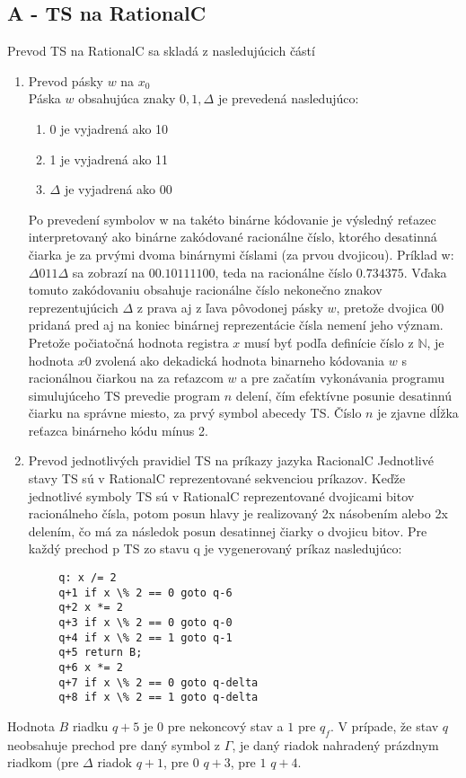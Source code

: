 \documentclass[10pt]{article}
\begin{document}
\subsection*{A - TS na RationalC}
Prevod TS na RationalC sa skladá z nasledujúcich částí
\begin{enumerate}
    \item Prevod pásky $w$ na $x_0$\\
        Páska $w$ obsahujúca znaky $0,1,\Delta$ je prevedená nasledujúco:
        \begin{enumerate}
            \item 0 je vyjadrená ako 10
            \item 1 je vyjadrená ako 11
            \item $\Delta$ je vyjadrená ako 00
        \end{enumerate}
        Po prevedení symbolov w na takéto binárne kódovanie je výsledný reťazec interpretovaný ako
        binárne zakódované racionálne číslo, ktorého desatinná čiarka je za prvými dvoma binárnymi
        číslami (za prvou dvojicou).
        Príklad w: $\Delta011\Delta$ sa zobrazí na $00. 10 11 11 00$, teda na racionálne číslo
        $0.734375$. Vďaka tomuto zakódovaniu obsahuje racionálne číslo nekonečno znakov
        reprezentujúcich $\Delta$ z prava aj z ľava pôvodonej pásky $w$, pretože dvojica 00 pridaná
        pred aj na koniec binárnej reprezentácie čísla nemení jeho význam.
        Pretože počiatočná hodnota registra $x$ musí byť podľa definície číslo z $\mathbb{N}$, 
        je hodnota $x0$ zvolená ako dekadická hodnota binarneho kódovania $w$ s racionálnou čiarkou
        na za reťazcom $w$ a pre začatím vykonávania programu simulujúceho TS prevedie program
        $n$ delení, čím efektívne posunie desatinnú čiarku na správne miesto, za prvý symbol abecedy
        TS. Číslo $n$ je zjavne dĺžka reťazca binárneho kódu mínus 2.

    \item Prevod jednotlivých pravidiel TS na príkazy jazyka RacionalC
        Jednotlivé stavy TS sú v RationalC reprezentované sekvenciou príkazov. 
        Keďže jednotlivé symboly TS sú v RationalC reprezentované dvojicami bitov racionálneho čísla, potom posun hlavy je
        realizovaný 2x násobením alebo 2x delením, čo má za následok posun desatinnej čiarky o
        dvojicu bitov.
        Pre každý prechod p TS zo stavu q je vygenerovaný príkaz nasledujúco:
\end{enumerate}
        \begin{verbatim}
        q: x /= 2   
        q+1 if x \% 2 == 0 goto q-6 
        q+2 x *= 2
        q+3 if x \% 2 == 0 goto q-0 
        q+4 if x \% 2 == 1 goto q-1 
        q+5 return B;
        q+6 x *= 2
        q+7 if x \% 2 == 0 goto q-delta
        q+8 if x \% 2 == 1 goto q-delta
        \end{verbatim}
        Hodnota $B$ riadku $q+5$ je 0 pre nekoncový stav a $1$ pre $q_f$.
        V prípade, že stav $q$ neobsahuje prechod pre daný symbol z $\Gamma$, je daný riadok
        nahradený prázdnym riadkom (pre $\Delta$ riadok $q+1$, pre $0$ $q+3$, pre $1$ $q+4$.
\end{document}

